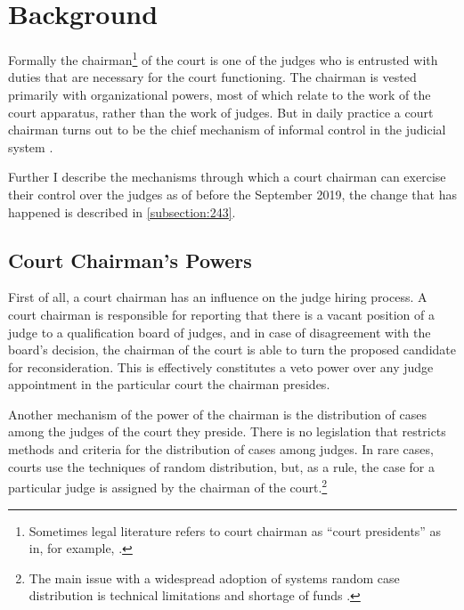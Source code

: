 \documentclass[12pt]{article}
\numberwithin{equation}{section}
\numberwithin{table}{section}
\numberwithin{figure}{section}
\begin{document}
\section{Background}

Formally the chairman\footnote{Sometimes legal literature refers to court chairman as ``court presidents'' as in, for example, \citet{Zholobov2022}.} of the court is one of the judges who is entrusted with duties that are necessary for the court functioning. 
The chairman is vested primarily with organizational powers, most of which relate to the work of the court apparatus, rather than the work of judges. 
But in daily practice a court chairman turns out to be the chief mechanism of informal control in the judicial system \citep{Makarova2017}. 

Further I describe the mechanisms through which a court chairman can exercise their control over the judges as of before the September 2019, the change that has happened is described in \vref{subsection:243}.

\subsection{Court Chairman's Powers}




First of all, a court chairman has an influence on the judge hiring process. 
A court chairman is responsible for reporting that there is a vacant position of a judge to a qualification board of judges, and in case of disagreement with the board's decision, the chairman of the court is able to turn the proposed candidate for reconsideration. 
This is effectively constitutes a veto power over any judge appointment in the particular court the chairman presides. 

Another mechanism of the power of the chairman is the distribution of cases among the judges of the court they preside. 
There is no legislation that restricts methods and criteria for the distribution of cases among judges.
In rare cases, courts use the techniques of random distribution, but, as a rule, the case for a particular judge is assigned by the chairman of the court.\footnote{The main issue with a widespread adoption of systems random case distribution is technical limitations and shortage of funds \citep{Galkina2019}.}
\end{document}
